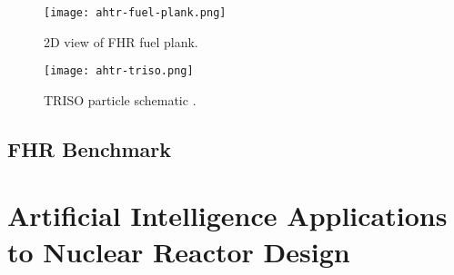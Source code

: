 \begin{figure}[]
    \centering
    \texttt{[image: ahtr-fuel-plank.png]} 
    \caption{2D view of FHR fuel plank.}
    \label{fig:ahtr-fuel-plank}
\end{figure}

\begin{figure}[]
    \centering
    \texttt{[image: ahtr-triso.png]} 
    \caption{TRISO particle schematic \cite{noauthor_fluoride_nodate}.}
    \label{fig:ahtr-triso}
\end{figure}

\subsection{FHR Benchmark}


\section{Artificial Intelligence Applications to Nuclear Reactor Design}